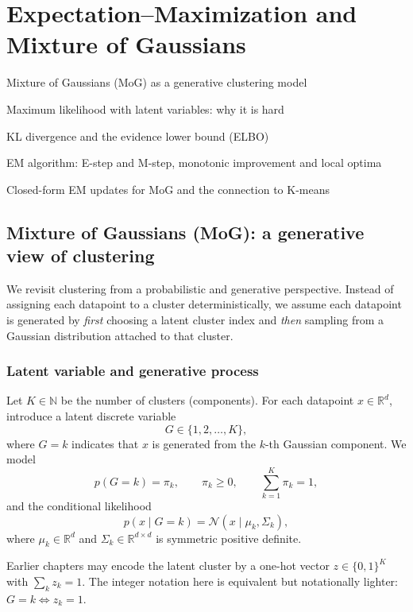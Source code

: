 \documentclass[../main]{subfiles}
\begin{document}
\chapter{Expectation--Maximization and Mixture of Gaussians}
\begin{introduction}
    \item Mixture of Gaussians (MoG) as a generative clustering model
    \item Maximum likelihood with latent variables: why it is hard
    \item KL divergence and the evidence lower bound (ELBO)
    \item EM algorithm: E-step and M-step, monotonic improvement and local optima
    \item Closed-form EM updates for MoG and the connection to K-means
\end{introduction}

\section{Mixture of Gaussians (MoG): a generative view of clustering}
We revisit clustering from a probabilistic and generative perspective.
Instead of assigning each datapoint to a cluster deterministically, we assume
each datapoint is generated by \emph{first} choosing a latent cluster index and
\emph{then} sampling from a Gaussian distribution attached to that cluster.

\subsection{Latent variable and generative process}
Let $K\in\mathbb N$ be the number of clusters (components). For each datapoint
$x\in\mathbb R^d$, introduce a latent discrete variable
\begin{equation}
    G \in \{1,2,\dots,K\},
\end{equation}
where $G=k$ indicates that $x$ is generated from the $k$-th Gaussian component.
We model
\begin{equation}
    p(G=k)=\pi_k,\qquad \pi_k\ge 0,\qquad \sum_{k=1}^K \pi_k = 1,
\end{equation}
and the conditional likelihood
\begin{equation}
    p(x\mid G=k)=\mathcal N(x\mid \mu_k,\Sigma_k),
\end{equation}
where $\mu_k\in\mathbb R^d$ and $\Sigma_k\in\mathbb R^{d\times d}$ is symmetric
positive definite.

\begin{note}
    Earlier chapters may encode the latent cluster by a one-hot vector
    $z\in\{0,1\}^K$ with $\sum_k z_k=1$.  The integer notation here is
    equivalent but notationally lighter:
    $G=k \Longleftrightarrow z_k=1$.
\end{note}
\end{document}
